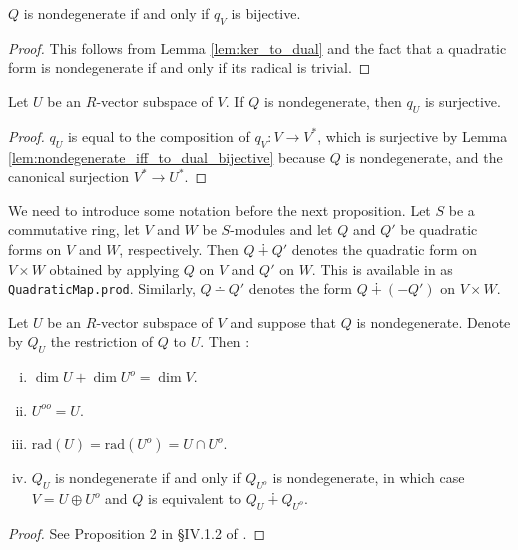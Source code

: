 \begin{lemma}\label{lem:nondegenerate_iff_to_dual_bijective}
\leanok
$Q$ is nondegenerate if and only if $q_V$ is bijective.
\end{lemma}
\begin{proof}
\leanok
This follows from Lemma \ref{lem:ker_to_dual} and the fact that a quadratic form is nondegenerate if and only if its radical is trivial.
\end{proof}

\begin{lemma}\label{lem:to_dual_surjective}
Let $U$ be an $R$-vector subspace of $V$. If $Q$ is nondegenerate, then $q_U$ is surjective.
\leanok
{}
\end{lemma}
\begin{proof}
\leanok
$q_U$ is equal to the composition of $q_V : V \to V^*$, which is surjective by Lemma \ref{lem:nondegenerate_iff_to_dual_bijective} because $Q$ is nondegenerate, and the canonical surjection $V^* \to U^*$.
\end{proof}

We need to introduce some notation before the next proposition. Let $S$ be a commutative ring, let $V$ and $W$ be $S$-modules and let $Q$ and $Q'$ be quadratic forms on $V$ and $W$, respectively. Then $Q \dotplus Q'$ denotes the quadratic form on $V \times W$ obtained by applying $Q$ on $V$ and $Q'$ on $W$. This is available in \mathlib as \texttt{QuadraticMap.prod}. Similarly, $Q \dotminus Q'$ denotes the form $Q \dotplus (-Q')$ on $V \times W$.

\begin{proposition}\label{prop:ortho_compl_properties}
\leanok
{}
Let $U$ be an $R$-vector subspace of $V$ and suppose that $Q$ is nondegenerate. Denote by $Q_U$ the restriction of $Q$ to $U$. Then :
\begin{enumerate}[(i)]
\item $\dim U + \dim U^o = \dim V$.
\item $U^{oo} = U$.
\item $\text{rad}(U) = \text{rad}(U^o) = U \cap U^o$.
\item $Q_U$ is nondegenerate if and only if $Q_{U^o}$ is nondegenerate, in which case $V = U \oplus U^o$ and $Q$ is equivalent to $Q_U \dotplus Q_{U^o}$.
\end{enumerate}
\end{proposition}
\begin{proof}
\leanok
{}
See Proposition 2 in \S IV.1.2 of \cite{Ser73}.
\end{proof}

